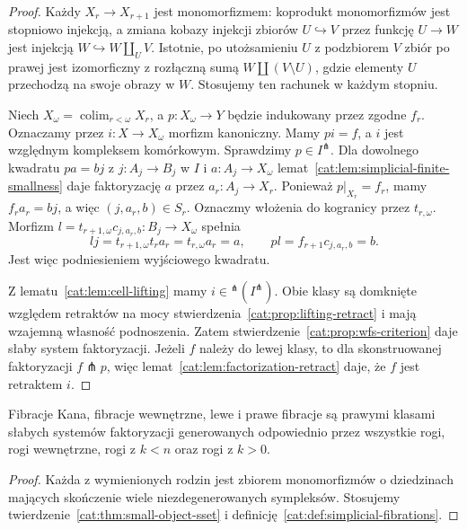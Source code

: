 \begin{proof}
Każdy $X_r\to X_{r+1}$ jest monomorfizmem: koprodukt monomorfizmów jest stopniowo injekcją, a zmiana kobazy injekcji zbiorów $U\hookrightarrow V$ przez funkcję $U\to W$ jest injekcją $W\hookrightarrow W\amalg_U V$. Istotnie, po utożsamieniu $U$ z podzbiorem $V$ zbiór po prawej jest izomorficzny z rozłączną sumą $W\amalg(V\setminus U)$, gdzie elementy $U$ przechodzą na swoje obrazy w $W$. Stosujemy ten rachunek w każdym stopniu.

Niech $X_\omega=\operatorname{colim}_{r<\omega}X_r$, a $p:X_\omega\to Y$ będzie indukowany przez zgodne $f_r$. Oznaczamy przez $i:X\to X_\omega$ morfizm kanoniczny. Mamy $pi=f$, a $i$ jest względnym kompleksem komórkowym. Sprawdzimy $p\in I^\pitchfork$. Dla dowolnego kwadratu $pa=bj$ z $j:A_j\to B_j$ w $I$ i $a:A_j\to X_\omega$ lemat~\ref{cat:lem:simplicial-finite-smallness} daje faktoryzację $a$ przez $a_r:A_j\to X_r$. Ponieważ $p|_{X_r}=f_r$, mamy $f_ra_r=bj$, a więc $(j,a_r,b)\in S_r$. Oznaczmy włożenia do kogranicy przez $t_{r,\omega}$. Morfizm $l=t_{r+1,\omega}c_{j,a_r,b}:B_j\to X_\omega$ spełnia
\[
 lj=t_{r+1,\omega}t_ra_r=t_{r,\omega}a_r=a,\qquad
 pl=f_{r+1}c_{j,a_r,b}=b.
\]
Jest więc podniesieniem wyjściowego kwadratu.

Z lematu~\ref{cat:lem:cell-lifting} mamy $i\in{}^\pitchfork(I^\pitchfork)$. Obie klasy są domknięte względem retraktów na mocy stwierdzenia~\ref{cat:prop:lifting-retract} i mają wzajemną własność podnoszenia. Zatem stwierdzenie~\ref{cat:prop:wfs-criterion} daje słaby system faktoryzacji. Jeżeli $f$ należy do lewej klasy, to dla skonstruowanej faktoryzacji $f\pitchfork p$, więc lemat~\ref{cat:lem:factorization-retract} daje, że $f$ jest retraktem $i$.
\end{proof}

\begin{wniosek}\label{cat:cor:horn-wfs}
Fibracje Kana, fibracje wewnętrzne, lewe i prawe fibracje są prawymi klasami słabych systemów faktoryzacji generowanych odpowiednio przez wszystkie rogi, rogi wewnętrzne, rogi z $k<n$ oraz rogi z $k>0$.
\end{wniosek}
\begin{proof}
Każda z wymienionych rodzin jest zbiorem monomorfizmów o dziedzinach mających skończenie wiele niezdegenerowanych sympleksów. Stosujemy twierdzenie~\ref{cat:thm:small-object-sset} i definicję~\ref{cat:def:simplicial-fibrations}.
\end{proof}

